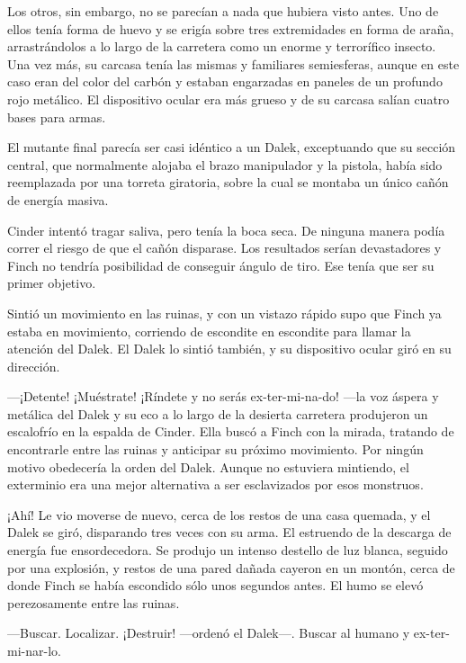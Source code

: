 Los otros, sin embargo, no se parecían a nada que hubiera visto antes. Uno de ellos tenía forma de huevo y se erigía sobre tres extremidades en forma de araña, arrastrándolos a lo largo de la carretera como un enorme y terrorífico insecto. Una vez más, su carcasa tenía las mismas y familiares semiesferas, aunque en este caso eran del color del carbón y estaban engarzadas en paneles de un profundo rojo metálico. El dispositivo ocular era más grueso y de su carcasa salían cuatro bases para armas.

El mutante final parecía ser casi idéntico a un Dalek, exceptuando que su sección central, que normalmente alojaba el brazo manipulador y la pistola, había sido reemplazada por una torreta giratoria, sobre la cual se montaba un único cañón de energía masiva.

Cinder intentó tragar saliva, pero tenía la boca seca. De ninguna manera podía correr el riesgo de que el cañón disparase. Los resultados serían devastadores y Finch no tendría posibilidad de conseguir ángulo de tiro. Ese tenía que ser su primer objetivo.

Sintió un movimiento en las ruinas, y con un vistazo rápido supo que Finch ya estaba en movimiento, corriendo de escondite en escondite para llamar la atención del Dalek. El Dalek lo sintió también, y su dispositivo ocular giró en su dirección.



—¡Detente! ¡Muéstrate! ¡Ríndete y no serás ex-ter-mi-na-do! —la voz áspera y metálica del Dalek y su eco a lo largo de la desierta carretera produjeron un escalofrío en la espalda de Cinder. Ella buscó a Finch con la mirada, tratando de encontrarle entre las ruinas y anticipar su próximo movimiento. Por ningún motivo obedecería la orden del Dalek. Aunque no estuviera mintiendo, el exterminio era una mejor alternativa a ser esclavizados por esos monstruos.



¡Ahí! Le vio moverse de nuevo, cerca de los restos de una casa quemada, y el Dalek se giró, disparando tres veces con su arma. El estruendo de la descarga de energía fue ensordecedora. Se produjo un intenso destello de luz blanca, seguido por una explosión, y restos de una pared dañada cayeron en un montón, cerca de donde Finch se había escondido sólo unos segundos antes. El humo se elevó perezosamente entre las ruinas.



—Buscar. Localizar. ¡Destruir! —ordenó el Dalek—. Buscar al humano y ex-ter-mi-nar-lo.

